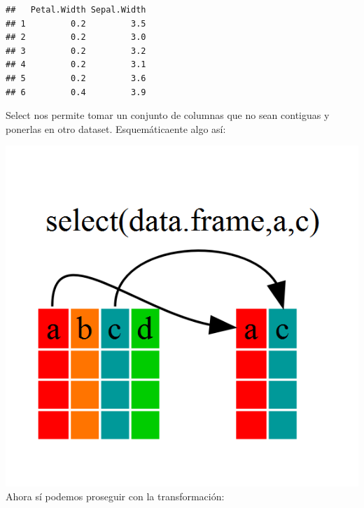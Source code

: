 \documentclass[
]{book}
\newenvironment{Shaded}{\begin{snugshade}}{\end{snugshade}}
\newcommand{\CommentTok}[1]{\textcolor[rgb]{0.56,0.35,0.01}{\textit{#1}}}
\newcommand{\DecValTok}[1]{\textcolor[rgb]{0.00,0.00,0.81}{#1}}
\newcommand{\FloatTok}[1]{\textcolor[rgb]{0.00,0.00,0.81}{#1}}
\newcommand{\FunctionTok}[1]{\textcolor[rgb]{0.00,0.00,0.00}{#1}}
\newcommand{\NormalTok}[1]{#1}
\newcommand{\OtherTok}[1]{\textcolor[rgb]{0.56,0.35,0.01}{#1}}
\newcommand{\SpecialCharTok}[1]{\textcolor[rgb]{0.00,0.00,0.00}{#1}}
\begin{document}
\begin{verbatim}
##   Petal.Width Sepal.Width
## 1         0.2         3.5
## 2         0.2         3.0
## 3         0.2         3.2
## 4         0.2         3.1
## 5         0.2         3.6
## 6         0.4         3.9
\end{verbatim}

Select nos permite tomar un conjunto de columnas que no sean contiguas y ponerlas en otro dataset.
Esquemáticaente algo así:

\includegraphics[width=7.89in]{img/select}
Ahora sí podemos proseguir con la transformación:

\begin{Shaded}
\end{Shaded}
\end{document}
